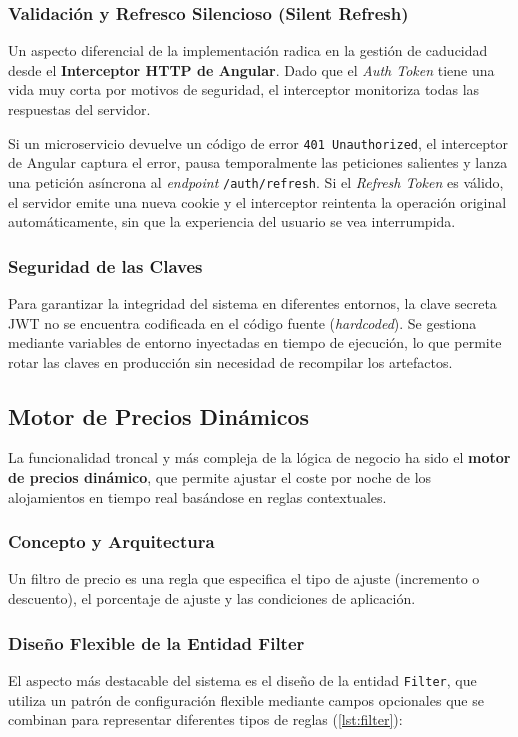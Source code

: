 \subsubsection{Validación y Refresco Silencioso (Silent Refresh)}
Un aspecto diferencial de la implementación radica en la gestión de caducidad desde el \textbf{Interceptor HTTP de Angular}. Dado que el \textit{Auth Token} tiene una vida muy corta por motivos de seguridad, el interceptor monitoriza todas las respuestas del servidor. 

Si un microservicio devuelve un código de error \texttt{401 Unauthorized}, el interceptor de Angular captura el error, pausa temporalmente las peticiones salientes y lanza una petición asíncrona al \textit{endpoint} \texttt{/auth/refresh}. Si el \textit{Refresh Token} es válido, el servidor emite una nueva cookie y el interceptor reintenta la operación original automáticamente, sin que la experiencia del usuario se vea interrumpida.

\subsubsection{Seguridad de las Claves}
Para garantizar la integridad del sistema en diferentes entornos, la clave secreta JWT no se encuentra codificada en el código fuente (\textit{hardcoded}). Se gestiona mediante variables de entorno inyectadas en tiempo de ejecución, lo que permite rotar las claves en producción sin necesidad de recompilar los artefactos.

\subsection{Motor de Precios Dinámicos}
La funcionalidad troncal y más compleja de la lógica de negocio ha sido el \textbf{motor de precios dinámico}, que permite ajustar el coste por noche de los alojamientos en tiempo real basándose en reglas contextuales.

\subsubsection{Concepto y Arquitectura}
Un filtro de precio es una regla que especifica el tipo de ajuste (incremento o descuento), el porcentaje de ajuste y las condiciones de aplicación.

\subsubsection{Diseño Flexible de la Entidad Filter}
El aspecto más destacable del sistema es el diseño de la entidad \texttt{Filter}, que utiliza un patrón de configuración flexible mediante campos opcionales que se combinan para representar diferentes tipos de reglas (\ref{lst:filter}):

